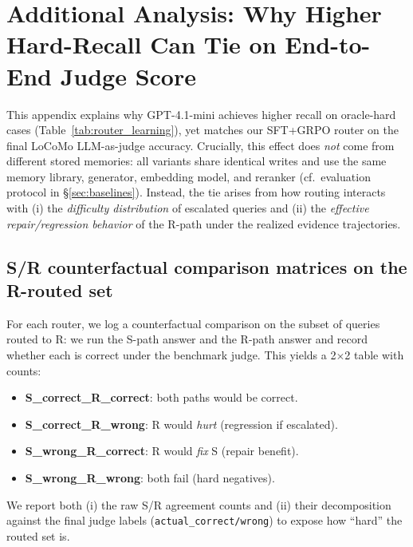 \documentclass{article}
\theoremstyle{plain}
\theoremstyle{definition}
\theoremstyle{remark}
\begin{document}






\section{Additional Analysis: Why Higher Hard-Recall Can Tie on End-to-End Judge Score}
\label{app:router_counterfactual}

This appendix explains why GPT-4.1-mini achieves higher recall on oracle-hard cases (Table~\ref{tab:router_learning}),
yet matches our SFT+GRPO router on the final LoCoMo LLM-as-judge accuracy.
Crucially, this effect does \emph{not} come from different stored memories:
all variants share identical writes and use the same memory library, generator, embedding model, and reranker (cf.\ evaluation protocol in \S\ref{sec:baselines}).
Instead, the tie arises from how routing interacts with (i) the \emph{difficulty distribution} of escalated queries and
(ii) the \emph{effective repair/regression behavior} of the R-path under the realized evidence trajectories.

\subsection{S/R counterfactual comparison matrices on the R-routed set}
\label{app:router_counterfactual_matrices}

For each router, we log a counterfactual comparison on the subset of queries routed to R:
we run the S-path answer and the R-path answer and record whether each is correct under the benchmark judge.
This yields a 2$\times$2 table with counts:
\begin{itemize}
    \item \textbf{S\_correct\_R\_correct}: both paths would be correct.
    \item \textbf{S\_correct\_R\_wrong}: R would \emph{hurt} (regression if escalated).
    \item \textbf{S\_wrong\_R\_correct}: R would \emph{fix} S (repair benefit).
    \item \textbf{S\_wrong\_R\_wrong}: both fail (hard negatives).
\end{itemize}
We report both (i) the raw S/R agreement counts and (ii) their decomposition against the final judge labels (\texttt{actual\_correct/wrong})
to expose how ``hard'' the routed set is.
\end{document}
